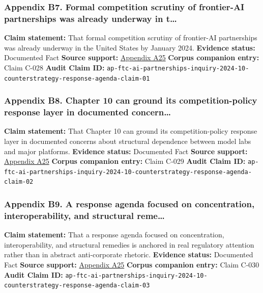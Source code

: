 \documentclass[
  american,
  11pt,
  letterpaper,
]{article}
\begin{document}
\subsubsection{Appendix B7. Formal competition scrutiny of frontier-AI
partnerships was already underway in
t\ldots{}}\label{ch-10-appendix-b7-formal-competition-scrutiny-of-frontier-ai-partnerships-was-already-underway-in-t}

\textbf{Claim statement:} That formal competition scrutiny of
frontier-AI partnerships was already underway in the United States by
January 2024. \textbf{Evidence status:} Documented Fact \textbf{Source
support:}
\hyperref[ch-10-appendix-a25-ftc-opens-inquiry-into-big-tech-s-partnerships-with-leading-ai-startups]{Appendix
A25} \textbf{Corpus companion entry:} Claim C-028 \textbf{Audit Claim
ID:}
\texttt{ap-ftc-ai-partnerships-inquiry-2024-10-counterstrategy-response-agenda-claim-01}

\subsubsection{Appendix B8. Chapter 10 can ground its competition-policy
response layer in documented
concern\ldots{}}\label{ch-10-appendix-b8-chapter-10-can-ground-its-competition-policy-response-layer-in-documented-concern}

\textbf{Claim statement:} That Chapter 10 can ground its
competition-policy response layer in documented concerns about
structural dependence between model labs and major platforms.
\textbf{Evidence status:} Documented Fact \textbf{Source support:}
\hyperref[ch-10-appendix-a25-ftc-opens-inquiry-into-big-tech-s-partnerships-with-leading-ai-startups]{Appendix
A25} \textbf{Corpus companion entry:} Claim C-029 \textbf{Audit Claim
ID:}
\texttt{ap-ftc-ai-partnerships-inquiry-2024-10-counterstrategy-response-agenda-claim-02}

\subsubsection{Appendix B9. A response agenda focused on concentration,
interoperability, and structural
reme\ldots{}}\label{ch-10-appendix-b9-a-response-agenda-focused-on-concentration-interoperability-and-structural-reme}

\textbf{Claim statement:} That a response agenda focused on
concentration, interoperability, and structural remedies is anchored in
real regulatory attention rather than in abstract anti-corporate
rhetoric. \textbf{Evidence status:} Documented Fact \textbf{Source
support:}
\hyperref[ch-10-appendix-a25-ftc-opens-inquiry-into-big-tech-s-partnerships-with-leading-ai-startups]{Appendix
A25} \textbf{Corpus companion entry:} Claim C-030 \textbf{Audit Claim
ID:}
\texttt{ap-ftc-ai-partnerships-inquiry-2024-10-counterstrategy-response-agenda-claim-03}
\end{document}
